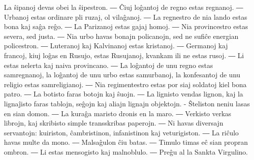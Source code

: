 La ŝipanoj devas obei la ŝipestron. ― Ĉiuj loĝantoj de regno estas regnanoj. ― Urbanoj estas ordinare pli ruzaj, ol vilaĝanoj. ― La regnestro de nia lando estas bona kaj saĝa reĝo. ― La Parizanoj estas gajaj homoj. ― Nia provincestro estas severa, sed justa. ― Nia urbo havas bonajn policanojn, sed ne sufiĉe energian policestron. ― Luteranoj kaj Kalvinanoj estas kristanoj. ― Germanoj kaj francoj, kiuj loĝas en Rusujo, estas Rusujanoj, kvankam ili ne estas rusoj. ― Li estas nelerta kaj naiva provincano. ― La loĝantoj de unu regno estas samregnanoj, la loĝantoj de unu urbo estas samurbanoj, la konfesantoj de unu religio estas samreligianoj. ― Nia regimentestro estas por siaj soldatoj kiel bona patro. ― La botisto faras botojn kaj ŝuojn. ― La lignisto vendas lignon, kaj la lignaĵisto faras tablojn, seĝojn kaj aliajn lignajn objektojn. - Ŝteliston neniu lasas en sian domon. ― La kuraĝa maristo dronis en la maro. ― Verkisto verkas librojn, kaj skribisto simple transskribas paperojn. ― Ni havas diversajn servantojn: kuiriston, ĉambristinon, infanistinon kaj veturigiston. ― La riĉulo havas multe da mono. ― Malsaĝulon ĉiu batas. ― Timulo timas eĉ sian propran ombron. ― Li estas mensogisto kaj malnoblulo. ― Preĝu al la Sankta Virgulino.

